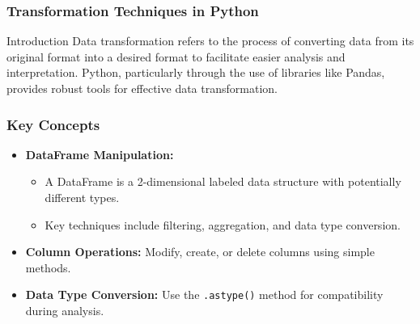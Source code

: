 \documentclass[aspectratio=169]{beamer}
\begin{document}
\begin{frame}
    \frametitle{Transformation Techniques in Python}
    \begin{block}{Introduction}
        Data transformation refers to the process of converting data from its original format into a desired format to facilitate easier analysis and interpretation. Python, particularly through the use of libraries like Pandas, provides robust tools for effective data transformation.
    \end{block}
\end{frame}

\begin{frame}
    \frametitle{Key Concepts}
    \begin{itemize}
        \item \textbf{DataFrame Manipulation:} 
        \begin{itemize}
            \item A DataFrame is a 2-dimensional labeled data structure with potentially different types.
            \item Key techniques include filtering, aggregation, and data type conversion.
        \end{itemize}
        \item \textbf{Column Operations:} Modify, create, or delete columns using simple methods.
        \item \textbf{Data Type Conversion:} Use the \texttt{.astype()} method for compatibility during analysis.
    \end{itemize}
\end{frame}
\end{document}
